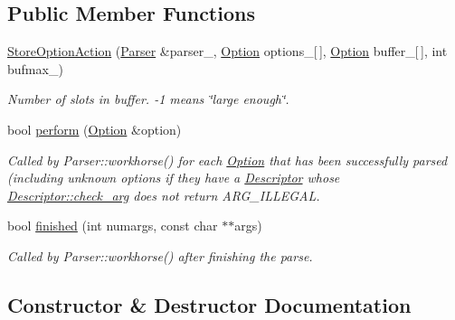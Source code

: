 \subsection*{Public Member Functions}
\begin{DoxyCompactItemize}
\item 
\hyperlink{classxmem_1_1config_1_1third__party_1_1_parser_1_1_store_option_action_aa6e4863f12c3f40b38d1571e75066aa4}{Store\+Option\+Action} (\hyperlink{classxmem_1_1config_1_1third__party_1_1_parser}{Parser} \&parser\+\_\+, \hyperlink{classxmem_1_1config_1_1third__party_1_1_option}{Option} options\+\_\+\mbox{[}$\,$\mbox{]}, \hyperlink{classxmem_1_1config_1_1third__party_1_1_option}{Option} buffer\+\_\+\mbox{[}$\,$\mbox{]}, int bufmax\+\_\+)
\begin{DoxyCompactList}\small\item\em Number of slots in {\ttfamily buffer}. {\ttfamily -\/1} means \char`\"{}large enough\char`\"{}. \end{DoxyCompactList}\item 
bool \hyperlink{classxmem_1_1config_1_1third__party_1_1_parser_1_1_store_option_action_ab34c68452366b58ad4163602cf5f435d}{perform} (\hyperlink{classxmem_1_1config_1_1third__party_1_1_option}{Option} \&option)
\begin{DoxyCompactList}\small\item\em Called by Parser\+::workhorse() for each \hyperlink{classxmem_1_1config_1_1third__party_1_1_option}{Option} that has been successfully parsed (including unknown options if they have a \hyperlink{structxmem_1_1config_1_1third__party_1_1_descriptor}{Descriptor} whose \hyperlink{structxmem_1_1config_1_1third__party_1_1_descriptor_a65b39f8d61de820bb5001d590e7dea5d}{Descriptor\+::check\+\_\+arg} does not return A\+R\+G\+\_\+\+I\+L\+L\+E\+G\+A\+L. \end{DoxyCompactList}\item 
bool \hyperlink{classxmem_1_1config_1_1third__party_1_1_parser_1_1_store_option_action_ad4e098cce0b0f97f025aec65d6226dff}{finished} (int numargs, const char $\ast$$\ast$args)
\begin{DoxyCompactList}\small\item\em Called by Parser\+::workhorse() after finishing the parse. \end{DoxyCompactList}\end{DoxyCompactItemize}


\subsection{Constructor \& Destructor Documentation}
\hypertarget{classxmem_1_1config_1_1third__party_1_1_parser_1_1_store_option_action_aa6e4863f12c3f40b38d1571e75066aa4}{}
